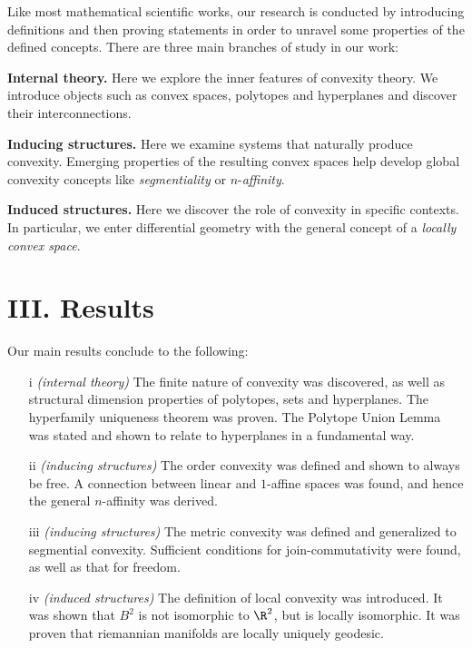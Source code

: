 \documentclass[conference]{IEEEtran}
\begin{document}
Like most mathematical scientific works, our research is conducted by introducing definitions and then proving statements in order to unravel some properties of the defined concepts. There are three main branches of study in our work:

\textbf{Internal theory.} Here we explore the inner features of convexity theory. We introduce objects such as convex spaces, polytopes and hyperplanes and discover their interconnections.

\textbf{Inducing structures.} Here we examine systems that naturally produce convexity. Emerging properties of the resulting convex spaces help develop global convexity concepts like \textit{segmentiality} or \(n\)-\textit{affinity}.

\textbf{Induced structures.} Here we discover the role of convexity in specific contexts. In particular, we enter differential geometry with the general concept of a \textit{locally convex space}.


\section*{\Large{III. Results}}

Our main results conclude to the following:

\begin{enumerate}
    \item[i] \textit{(internal theory)} The finite nature of convexity was discovered, as well as structural dimension properties of polytopes, sets and hyperplanes. The hyperfamily uniqueness theorem was proven. The Polytope Union Lemma was stated and shown to relate to hyperplanes in a fundamental way.
    
    \item[ii] \textit{(inducing structures)} The order convexity was defined and shown to always be free. A connection between linear and \(1\)-affine spaces was found, and hence the general \(n\)-affinity was derived.
    
    \item[iii] \textit{(inducing structures)} The metric convexity was defined and generalized to segmential convexity. Sufficient conditions for join-commutativity were found, as well as that for freedom.
    
    \item[iv] \textit{(induced structures)} The definition of local convexity was introduced. It was shown that \(B^2\) is not isomorphic to \(\R^2\), but is locally isomorphic. It was proven that riemannian manifolds are locally uniquely geodesic.
\end{enumerate}
\end{document}
